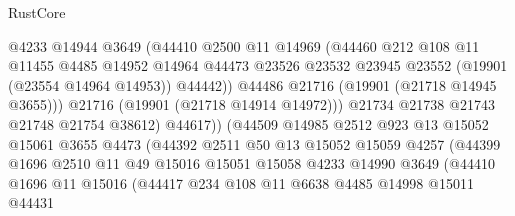 \begin{lexlean}{RustCore}
\begin{coremodule}
                              @4233
                              @14944
                              @3649
                              (@44410
                                @2500
                                @11
                                @14969
                                (@44460
                                  @212
                                  @108
                                  @11
                                  @11455
                                  @4485
                                  @14952
                                  @14964
                                  @44473
                                  @23526
                                  @23532
                                  @23945
                                  @23552
                                  (@19901 (@23554 @14964 @14953))
                                  @44442))
                              @44486
                              @21716
                              (@19901 (@21718 @14945 @3655)))
                            @21716
                            (@19901 (@21718 @14914 @14972)))
                          @21734
                          @21738
                          @21743
                          @21748
                          @21754
                          @38612)
                        @44617))
                    (@44509
                      @14985
                      @2512
                      @923
                      @13
                      @15052
                      @15061
                      @3655
                      @4473
                      (@44392
                        @2511
                        @50
                        @13
                        @15052
                        @15059
                        @4257
                        (@44399
                          @1696
                          @2510
                          @11
                          @49
                          @15016
                          @15051
                          @15058
                          @4233
                          @14990
                          @3649
                          (@44410
                            @1696
                            @11
                            @15016
                            (@44417
                              @234
                              @108
                              @11
                              @6638
                              @4485
                              @14998
                              @15011
                              @44431

\end{coremodule}
\end{lexlean}
